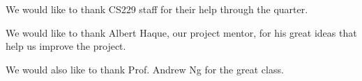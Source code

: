 \documentclass[conference,compsoc]{IEEEtran}
\begin{document}
We would like to thank CS229 staff for their help through the quarter.

We would like to thank Albert Haque, our project mentor, for his great ideas that help us improve the project. 

We would also like to thank Prof. Andrew Ng for the great class. 





%
%
%
\newpage
\end{document}
